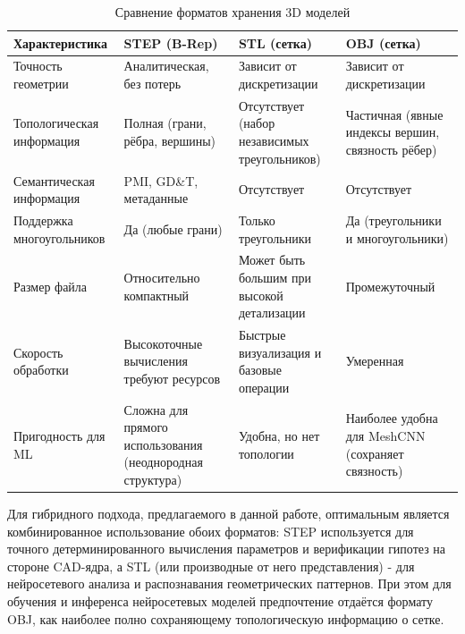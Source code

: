 \begin{table}[h]
\centering
\begin{tabular}{|p{3.5cm}|p{4cm}|p{4cm}|p{3cm}|}
\hline
Характеристика & STEP (B-Rep) & STL (сетка) & OBJ (сетка) \\
\hline
Точность геометрии & Аналитическая, без потерь & Зависит от дискретизации & Зависит от дискретизации \\
\hline
Топологическая информация & Полная (грани, рёбра, вершины) & Отсутствует (набор независимых треугольников) & Частичная (явные индексы вершин, связность рёбер) \\
\hline
Семантическая информация & PMI, GD\&T, метаданные & Отсутствует & Отсутствует \\
\hline
Поддержка многоугольников & Да (любые грани) & Только треугольники & Да (треугольники и многоугольники) \\
\hline
Размер файла & Относительно компактный & Может быть большим при высокой детализации & Проме\-жу\-точный \\
\hline
Скорость обработки & Высокоточные вычисления требуют ресурсов & Быстрые визуализация и базовые операции & Умеренная \\
\hline
Пригодность для ML & Сложна для прямого использования (неоднородная структура) & Удобна, но нет топологии & Наиболее удобна для MeshCNN (сохраняет связность) \\
\hline
\end{tabular}
\caption{Сравнение форматов хранения 3D моделей}
\label{tab:cmp-3d-format}
\end{table}

Для гибридного подхода, предлагаемого в данной работе, оптимальным является комбинированное использование обоих форматов: STEP используется для точного детерминированного вычисления параметров и верификации гипотез на стороне CAD-ядра, а STL (или производные от него представления) - для нейросетевого анализа и распознавания геометрических паттернов. При этом для обучения и инференса нейросетевых моделей предпочтение отдаётся формату OBJ, как наиболее полно сохраняющему топологическую информацию о сетке.

